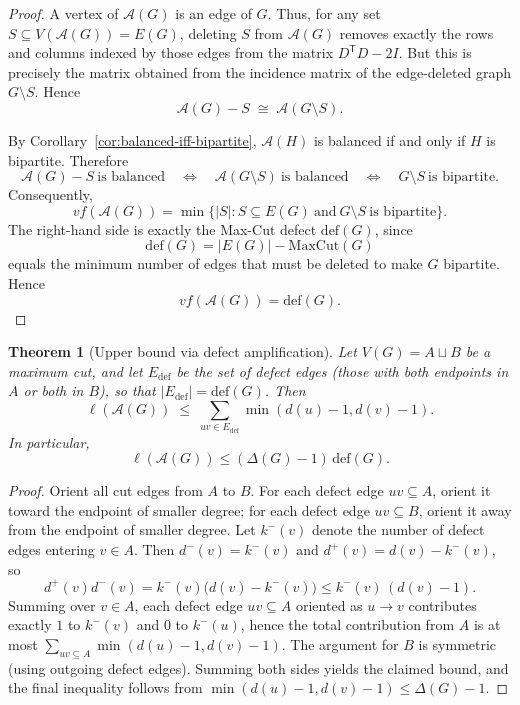 \documentclass[11pt]{article}
\newtheorem{theorem}{Theorem}
\theoremstyle{plain}
\begin{document}
\begin{proof}
A vertex of $\mathcal A(G)$ is an edge of $G$.
Thus, for any set $S\subseteq V(\mathcal A(G))=E(G)$, deleting $S$ from
$\mathcal A(G)$ removes exactly the rows and columns indexed by those edges from
the matrix $D^{\mathsf T}D-2I$.
But this is precisely the matrix obtained from the incidence matrix of the
edge-deleted graph $G\setminus S$.
Hence
\[
\mathcal A(G)-S \;\cong\; \mathcal A(G\setminus S).
\]

By Corollary~\ref{cor:balanced-iff-bipartite}, $\mathcal A(H)$ is balanced if
and only if $H$ is bipartite.
Therefore
\[
\mathcal A(G)-S\ \text{is balanced}
\quad\Longleftrightarrow\quad
\mathcal A(G\setminus S)\ \text{is balanced}
\quad\Longleftrightarrow\quad
G\setminus S\ \text{is bipartite}.
\]
Consequently,
\[
vf(\mathcal A(G))
=
\min\{|S|:S\subseteq E(G)\ \text{and}\ G\setminus S\ \text{is bipartite}\}.
\]
The right-hand side is exactly the Max-Cut defect $\mathrm{def}(G)$, since
\[
\mathrm{def}(G)=|E(G)|-\mathrm{MaxCut}(G)
\]
equals the minimum number of edges that must be deleted to make $G$ bipartite.
Hence
\[
vf(\mathcal A(G))=\mathrm{def}(G).
\]
\end{proof}



\begin{theorem}[Upper bound via defect amplification]\label{thm:frustration-upper}
Let $V(G)=A\sqcup B$ be a maximum cut, and let $E_{\mathrm{def}}$ be the set of defect edges
(those with both endpoints in $A$ or both in $B$), so that $|E_{\mathrm{def}}|=\mathrm{def}(G)$.
Then
\[
\ell(\mathcal A(G)) \;\le\; \sum_{uv\in E_{\mathrm{def}}} \min(d(u)-1,d(v)-1).
\]
In particular,
\[
\ell(\mathcal A(G))\le (\Delta(G)-1)\,\mathrm{def}(G).
\]
\end{theorem}

\begin{proof}
Orient all cut edges from $A$ to $B$. For each defect edge $uv\subseteq A$, orient it toward
the endpoint of smaller degree; for each defect edge $uv\subseteq B$, orient it away from the
endpoint of smaller degree. Let $k^-(v)$ denote the number of defect edges entering $v\in A$.
Then $d^-(v)=k^-(v)$ and $d^+(v)=d(v)-k^-(v)$, so
\[
d^+(v)d^-(v)=k^-(v)\bigl(d(v)-k^-(v)\bigr)\le k^-(v)\,(d(v)-1).
\]
Summing over $v\in A$, each defect edge $uv\subseteq A$ oriented as $u\to v$ contributes
exactly $1$ to $k^-(v)$ and $0$ to $k^-(u)$, hence the total contribution from $A$ is at most
$\sum_{uv\subseteq A}\min(d(u)-1,d(v)-1)$. The argument for $B$ is symmetric (using outgoing
defect edges). Summing both sides yields the claimed bound, and the final inequality follows
from $\min(d(u)-1,d(v)-1)\le \Delta(G)-1$.
\end{proof}
\end{document}
